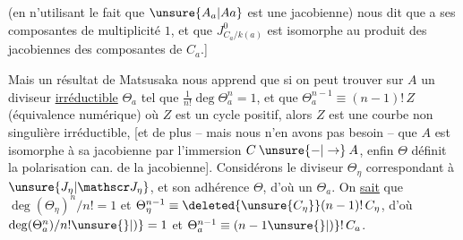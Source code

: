 
(en n'utilisant  le fait que $\unsure{A_a|Aa}$ est une jacobienne) nous dit que   a  ses composantes de multiplicité $1$, et que $J^0_{C_a/k(a)}$ est isomorphe au produit des jacobiennes des composantes de $C_a$.]

Mais un résultat de Matsusaka  nous apprend que si on peut trouver sur $A$ un diviseur  \uline{irréductible} $\Theta_a$ tel que  $\frac{1}{n!}\deg\Theta_{a}^n=1$,  et que $\Theta_a^{n-1}\equiv(n-1)!\,Z$ (équivalence numérique) où $Z$ est un cycle positif, alors $Z$ est  une courbe non singulière irréductible, [et de plus -- mais nous n'en avons pas besoin -- que $A$ est isomorphe à sa jacobienne \deleted{\unsure{]}} par l'immersion $C\mathbin{\unsure{-|\to}}A$, enfin $\Theta$ définit la polarisation can. de la jacobienne].
  Considérons le diviseur $\Theta_\eta$ correspondant à $\unsure{J_\eta|\mathscr J_\eta}$, et son adhérence $\Theta$, d'où un $\Theta_a$. On \uline{sait} que $\deg(\Theta_\eta)^n/n!=1$ et $\Theta_\eta^{n-1}\equiv\deleted{\unsure{C_\eta}}(n-1)!\,C_\eta$, d'où $\deg(\Theta_a^n)/n!\unsure{\}|)}=1$ et $\Theta_a^{n-1}\equiv(n-1\unsure{\}|)}!\,C_a$.  

